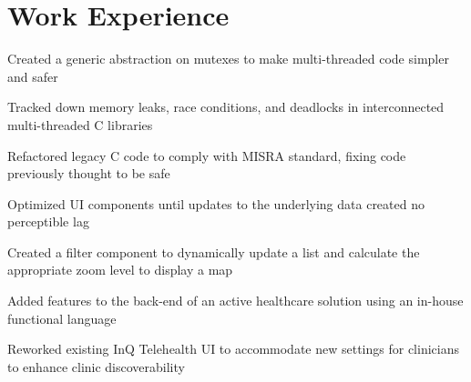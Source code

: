 \section{Work Experience}

\begin{bullets}
	\item Created a generic abstraction on mutexes to make multi-threaded code simpler and safer
    \item Tracked down memory leaks, race conditions, and deadlocks in interconnected multi-threaded C libraries
    \item Refactored legacy C code to comply with MISRA standard, fixing code previously thought to be safe
\end{bullets}

\hbox{}

\begin{bullets}
    \item Optimized UI components until updates to the underlying data created no perceptible lag
    \item Created a filter component to dynamically update a list and calculate the appropriate zoom level to display a map
    \item Added features to the back-end of an active healthcare solution using an in-house functional language
    \item Reworked existing InQ Telehealth UI to accommodate new settings for clinicians to enhance clinic discoverability
\end{bullets}

\hbox{}

